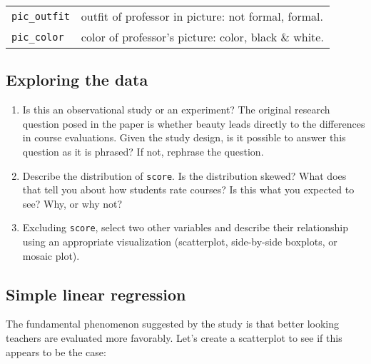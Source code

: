 \documentclass[
]{article}
\begin{document}
\begin{longtable}[]{@{}ll@{}}
\begin{minipage}[t]{0.56\columnwidth}\raggedright
\texttt{pic\_outfit}\strut
\end{minipage} & \begin{minipage}[t]{0.38\columnwidth}\raggedright
outfit of professor in picture: not formal, formal.\strut
\end{minipage}\tabularnewline
\begin{minipage}[t]{0.56\columnwidth}\raggedright
\texttt{pic\_color}\strut
\end{minipage} & \begin{minipage}[t]{0.38\columnwidth}\raggedright
color of professor's picture: color, black \& white.\strut
\end{minipage}\tabularnewline
\bottomrule
\end{longtable}

\hypertarget{exploring-the-data}{%
\subsection{Exploring the data}\label{exploring-the-data}}

\begin{enumerate}
\def\labelenumi{\arabic{enumi}.}
\item
  Is this an observational study or an experiment? The original research
  question posed in the paper is whether beauty leads directly to the
  differences in course evaluations. Given the study design, is it
  possible to answer this question as it is phrased? If not, rephrase
  the question.
\item
  Describe the distribution of \texttt{score}. Is the distribution
  skewed? What does that tell you about how students rate courses? Is
  this what you expected to see? Why, or why not?
\item
  Excluding \texttt{score}, select two other variables and describe
  their relationship using an appropriate visualization (scatterplot,
  side-by-side boxplots, or mosaic plot).
\end{enumerate}

\hypertarget{simple-linear-regression}{%
\subsection{Simple linear regression}\label{simple-linear-regression}}

The fundamental phenomenon suggested by the study is that better looking
teachers are evaluated more favorably. Let's create a scatterplot to see
if this appears to be the case:
\end{document}
